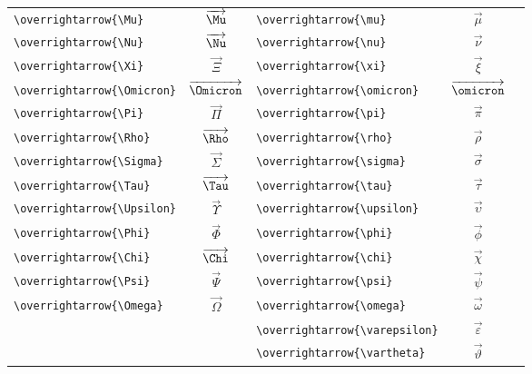 \documentclass[12pt,a4paper]{article}
\begin{document}
\begin{longtable}{|l|c|l|c|c|}
\verb|\overrightarrow{\Mu}|         & $\overrightarrow{\Mu}$      & \verb|\overrightarrow{\mu}|         & $\overrightarrow{\mu}$         & \\
\verb|\overrightarrow{\Nu}|         & $\overrightarrow{\Nu}$      & \verb|\overrightarrow{\nu}|         & $\overrightarrow{\nu}$         & \\
\verb|\overrightarrow{\Xi}|         & $\overrightarrow{\Xi}$      & \verb|\overrightarrow{\xi}|         & $\overrightarrow{\xi}$         & \\
\verb|\overrightarrow{\Omicron}|    & $\overrightarrow{\Omicron}$ & \verb|\overrightarrow{\omicron}|    & $\overrightarrow{\omicron}$    & \\
\verb|\overrightarrow{\Pi}|         & $\overrightarrow{\Pi}$      & \verb|\overrightarrow{\pi}|         & $\overrightarrow{\pi}$         & \\
\verb|\overrightarrow{\Rho}|        & $\overrightarrow{\Rho}$     & \verb|\overrightarrow{\rho}|        & $\overrightarrow{\rho}$        & \\
\verb|\overrightarrow{\Sigma}|      & $\overrightarrow{\Sigma}$   & \verb|\overrightarrow{\sigma}|      & $\overrightarrow{\sigma}$      & \\
\verb|\overrightarrow{\Tau}|        & $\overrightarrow{\Tau}$     & \verb|\overrightarrow{\tau}|        & $\overrightarrow{\tau}$        & \\
\verb|\overrightarrow{\Upsilon}|    & $\overrightarrow{\Upsilon}$ & \verb|\overrightarrow{\upsilon}|    & $\overrightarrow{\upsilon}$    & \\
\verb|\overrightarrow{\Phi}|        & $\overrightarrow{\Phi}$     & \verb|\overrightarrow{\phi}|        & $\overrightarrow{\phi}$        & \\
\verb|\overrightarrow{\Chi}|        & $\overrightarrow{\Chi}$     & \verb|\overrightarrow{\chi}|        & $\overrightarrow{\chi}$        & \\
\verb|\overrightarrow{\Psi}|        & $\overrightarrow{\Psi}$     & \verb|\overrightarrow{\psi}|        & $\overrightarrow{\psi}$        & \\
\verb|\overrightarrow{\Omega}|      & $\overrightarrow{\Omega}$   & \verb|\overrightarrow{\omega}|      & $\overrightarrow{\omega}$      & \\
                                    &                             & \verb|\overrightarrow{\varepsilon}| & $\overrightarrow{\varepsilon}$ & \\
                                    &                             & \verb|\overrightarrow{\vartheta}|   & $\overrightarrow{\vartheta}$   & \\

\end{longtable}
\end{document}
